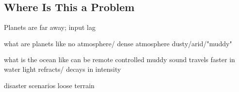\subsection{Where Is This a Problem}

Planets are far away; input lag

what are planets like
    no atmosphere/ dense atmosphere
    dusty/arid/"muddy"

what is the ocean like
    can be remote controlled
    muddy
    sound travels faster in water
    light refracts/ decays in intensity

disaster scenarios
    loose terrain
